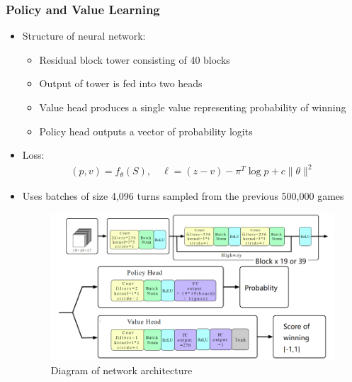 \documentclass{beamer}
\begin{document}
\begin{frame}
  \frametitle{Policy and Value Learning}

  \begin{itemize}
    \item Structure of neural network:
      \begin{itemize}
        \item Residual block tower consisting of 40 blocks
        \item Output of tower is fed into two heads
        \item Value head produces a single value representing probability of winning
        \item Policy head outputs a vector of probability logits
      \end{itemize}
    \item Loss:
      \begin{gather*}
        (p, v) = f_\theta(S), \quad \ell = (z - v) - \pi^T \log p + c \lVert \theta \rVert^2
      \end{gather*}
    \item Uses batches of size 4,096 turns sampled from the previous 500,000 games
    \begin{figure}
      \includegraphics[width=0.38\linewidth]{./images/network.png}
      \caption{Diagram of network architecture}
    \end{figure}
  \end{itemize}
\end{frame}


\end{document}
